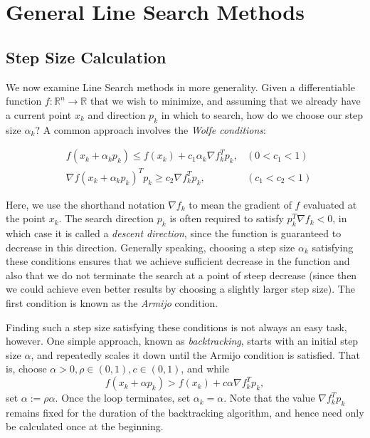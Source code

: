 \section*{General Line Search Methods}
\subsection*{Step Size Calculation}
We now examine Line Search methods in more generality. Given a differentiable function
$f : \mathbb{R}^n \rightarrow \mathbb{R}$ that we wish to minimize, and assuming that
we already have a current point $x_k$ and direction $p_k$ in which to search, how do we 
choose our step size $\alpha_k$? A common approach involves the \emph{Wolfe conditions}:

\begin{align*}
&f(x_k + \alpha_kp_k) \leq f(x_k) + c_1\alpha_k\nabla f_k^Tp_k, &(0 < c_1 < 1)
\\ &\nabla f(x_k + \alpha_kp_k)^Tp_k \geq c_2\nabla f_k^Tp_k, &(c_1 < c_2 < 1)
\end{align*}

Here, we use the shorthand notation $\nabla f_k$ to
mean the gradient of $f$ evaluated at the point $x_k$. The search direction $p_k$ is
often required to satisfy $p_k^T \nabla f_k < 0$, in which case it is called a
\emph{descent direction}, since the function is guaranteed to decrease in
this direction. Generally speaking, choosing a step size $\alpha_k$ satisfying these conditions
ensures that we achieve sufficient decrease in the function and also that we do not
terminate the search at a point of steep decrease (since then we could achieve even
better results by choosing a slightly larger step size). The first condition is known
as the \emph{Armijo} condition. 

Finding such a step size satisfying these conditions is not always an easy task, however.
One simple approach, known as \emph{backtracking}, starts with an initial step size
$\alpha$, and repeatedly scales it down until the Armijo condition is satisfied.
That is, choose $\alpha >0, \rho \in (0, 1), c\in (0, 1)$, and while
$$
f(x_k + \alpha p_k) > f(x_k) + c\alpha\nabla f_k^Tp_k,
$$
set $\alpha := \rho\alpha$. Once the loop terminates, set $\alpha_k = \alpha$. Note that the value
$\nabla f_k^Tp_k$ remains fixed for the duration of the backtracking algorithm, and hence need only 
be calculated once at the beginning.
%


